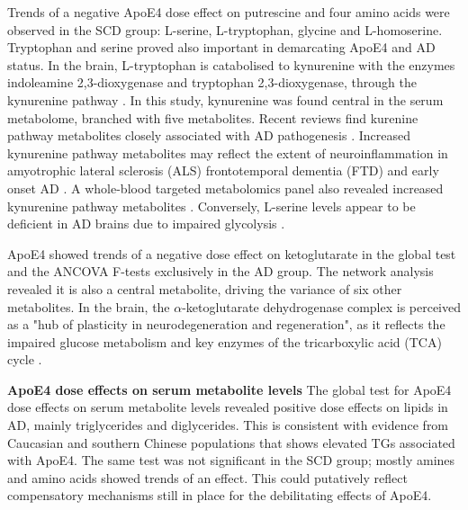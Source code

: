 \documentclass{amsart}
\begin{document}
Trends of a negative ApoE4 dose effect on putrescine and four amino acids were observed in the SCD group: L-serine, L-tryptophan, glycine and L-homoserine. Tryptophan and serine proved also important in demarcating ApoE4 and AD status. In the brain, L-tryptophan is catabolised to kynurenine with the enzymes indoleamine 2,3-dioxygenase and tryptophan 2,3-dioxygenase, through the kynurenine pathway \cite*{Liang2022KynureninePM}. In this study, kynurenine was found central in the serum metabolome, branched with five  metabolites. Recent reviews find kurenine pathway metabolites closely associated with AD pathogenesis \cite{Liang2022KynureninePM,Sharma2022KynurenineMA}. Increased kynurenine pathway metabolites may reflect the extent of neuroinflammation in amyotrophic lateral sclerosis (ALS) frontotemporal dementia (FTD) and early onset AD \cite*{Heylen2023BrainKP}. A whole-blood targeted metabolomics panel also revealed increased kynurenine pathway metabolites \cite{Teruya2021WholebloodMO}. Conversely, L-serine levels appear to be deficient in AD brains due to impaired glycolysis \cite{LeDouce2020ImpairmentOG}. 

ApoE4 showed trends of a negative dose effect on ketoglutarate in the global test and the ANCOVA F-tests exclusively in the AD group. The network analysis revealed it is also a central metabolite, driving the variance of six other metabolites. In the brain, the $\alpha$-ketoglutarate dehydrogenase complex is perceived as a "hub of plasticity in neurodegeneration and regeneration", as it reflects the impaired glucose metabolism and key enzymes of the tricarboxylic acid (TCA) cycle \cite*{Hansen2022TheD}.

\leavevmode\newline \textbf{ApoE4 dose effects on serum metabolite levels}\hspace{.25cm}
The global test for ApoE4 dose effects on serum metabolite levels revealed positive dose effects on lipids in AD, mainly triglycerides and diglycerides. This is consistent with evidence from Caucasian \cite{Maxwell2013APOEMT,CARVALHOWELLS20121447,Bernath2020SerumTI} and southern Chinese populations \cite{Gan2022EffectsPopulation} that shows elevated TGs associated with ApoE4. The same test was not significant in the SCD group; mostly amines and amino acids showed trends of an effect. This could putatively reflect compensatory mechanisms still in place for the debilitating effects of ApoE4.
\end{document}
